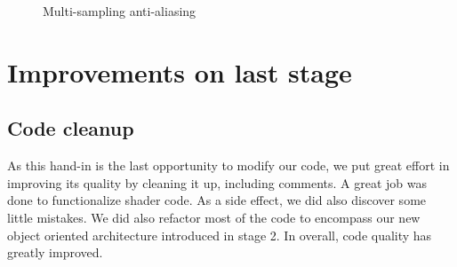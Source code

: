 \documentclass[a4paper,11pt]{article}
\begin{document}
\begin{figure}[ht]
	\centering
	 \quad
	 \quad
	\caption{Multi-sampling anti-aliasing}
	\label{images}
\end{figure}

\section{Improvements on last stage}

\subsection{Code cleanup}

As this hand-in is the last opportunity to modify our code, we put great effort in improving its quality by cleaning it up, including comments. A great job was done to functionalize shader code. As a side effect, we did also discover some little mistakes. We did also refactor most of the code to encompass our new object oriented architecture introduced in stage 2. In overall, code quality has greatly improved.
\end{document}
